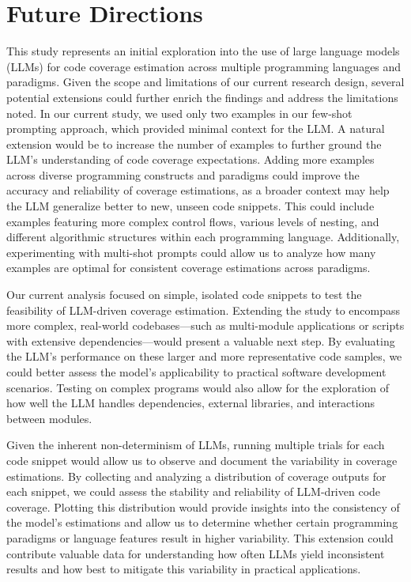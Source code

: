 \documentclass[sigconf]{acmart}
\begin{document}
\section{Future Directions}
This study represents an initial exploration into the use of large language models (LLMs) for code coverage estimation across multiple programming languages and paradigms. Given the scope and limitations of our current research design, several potential extensions could further enrich the findings and address the limitations noted. In our current study, we used only two examples in our few-shot prompting approach, which provided minimal context for the LLM. A natural extension would be to increase the number of examples to further ground the LLM's understanding of code coverage expectations. Adding more examples across diverse programming constructs and paradigms could improve the accuracy and reliability of coverage estimations, as a broader context may help the LLM generalize better to new, unseen code snippets. This could include examples featuring more complex control flows, various levels of nesting, and different algorithmic structures within each programming language. Additionally, experimenting with multi-shot prompts could allow us to analyze how many examples are optimal for consistent coverage estimations across paradigms.

Our current analysis focused on simple, isolated code snippets to test the feasibility of LLM-driven coverage estimation. Extending the study to encompass more complex, real-world codebases—such as multi-module applications or scripts with extensive dependencies—would present a valuable next step. By evaluating the LLM’s performance on these larger and more representative code samples, we could better assess the model’s applicability to practical software development scenarios. Testing on complex programs would also allow for the exploration of how well the LLM handles dependencies, external libraries, and interactions between modules.

Given the inherent non-determinism of LLMs, running multiple trials for each code snippet would allow us to observe and document the variability in coverage estimations. By collecting and analyzing a distribution of coverage outputs for each snippet, we could assess the stability and reliability of LLM-driven code coverage. Plotting this distribution would provide insights into the consistency of the model’s estimations and allow us to determine whether certain programming paradigms or language features result in higher variability. This extension could contribute valuable data for understanding how often LLMs yield inconsistent results and how best to mitigate this variability in practical applications.
\end{document}
